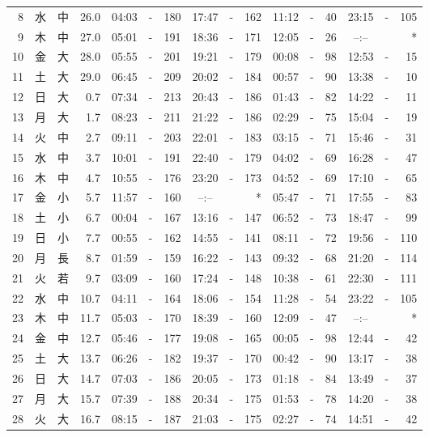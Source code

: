 \documentclass[12pt.a4j]{jsarticle}
\begin{document}
\begin{center}
\begin{table}[ht]
\begin{tabular}{|rc|cr|ccrccr|ccrccr|}
 8 & 水 & 中 & 26.0 & 04:03 &-& 180 & 17:47 &-& 162 & 11:12 &-&  40 & 23:15 &-& 105 \\
 9 & 木 & 中 & 27.0 & 05:01 &-& 191 & 18:36 &-& 171 & 12:05 &-&  26 & --:-- & &  *  \\
10 & 金 & 大 & 28.0 & 05:55 &-& 201 & 19:21 &-& 179 & 00:08 &-&  98 & 12:53 &-&  15 \\
11 & 土 & 大 & 29.0 & 06:45 &-& 209 & 20:02 &-& 184 & 00:57 &-&  90 & 13:38 &-&  10 \\
12 & 日 & 大 &  0.7 & 07:34 &-& 213 & 20:43 &-& 186 & 01:43 &-&  82 & 14:22 &-&  11 \\
13 & 月 & 大 &  1.7 & 08:23 &-& 211 & 21:22 &-& 186 & 02:29 &-&  75 & 15:04 &-&  19 \\
14 & 火 & 中 &  2.7 & 09:11 &-& 203 & 22:01 &-& 183 & 03:15 &-&  71 & 15:46 &-&  31 \\
15 & 水 & 中 &  3.7 & 10:01 &-& 191 & 22:40 &-& 179 & 04:02 &-&  69 & 16:28 &-&  47 \\
16 & 木 & 中 &  4.7 & 10:55 &-& 176 & 23:20 &-& 173 & 04:52 &-&  69 & 17:10 &-&  65 \\
17 & 金 & 小 &  5.7 & 11:57 &-& 160 & --:-- & &  *  & 05:47 &-&  71 & 17:55 &-&  83 \\
18 & 土 & 小 &  6.7 & 00:04 &-& 167 & 13:16 &-& 147 & 06:52 &-&  73 & 18:47 &-&  99 \\
19 & 日 & 小 &  7.7 & 00:55 &-& 162 & 14:55 &-& 141 & 08:11 &-&  72 & 19:56 &-& 110 \\
20 & 月 & 長 &  8.7 & 01:59 &-& 159 & 16:22 &-& 143 & 09:32 &-&  68 & 21:20 &-& 114 \\
21 & 火 & 若 &  9.7 & 03:09 &-& 160 & 17:24 &-& 148 & 10:38 &-&  61 & 22:30 &-& 111 \\
22 & 水 & 中 & 10.7 & 04:11 &-& 164 & 18:06 &-& 154 & 11:28 &-&  54 & 23:22 &-& 105 \\
23 & 木 & 中 & 11.7 & 05:03 &-& 170 & 18:39 &-& 160 & 12:09 &-&  47 & --:-- & &  *  \\
24 & 金 & 中 & 12.7 & 05:46 &-& 177 & 19:08 &-& 165 & 00:05 &-&  98 & 12:44 &-&  42 \\
25 & 土 & 大 & 13.7 & 06:26 &-& 182 & 19:37 &-& 170 & 00:42 &-&  90 & 13:17 &-&  38 \\
26 & 日 & 大 & 14.7 & 07:03 &-& 186 & 20:05 &-& 173 & 01:18 &-&  84 & 13:49 &-&  37 \\
27 & 月 & 大 & 15.7 & 07:39 &-& 188 & 20:34 &-& 175 & 01:53 &-&  78 & 14:20 &-&  38 \\
28 & 火 & 大 & 16.7 & 08:15 &-& 187 & 21:03 &-& 175 & 02:27 &-&  74 & 14:51 &-&  42 \\

\end{tabular}
\end{table}
\end{center}
\end{document}
